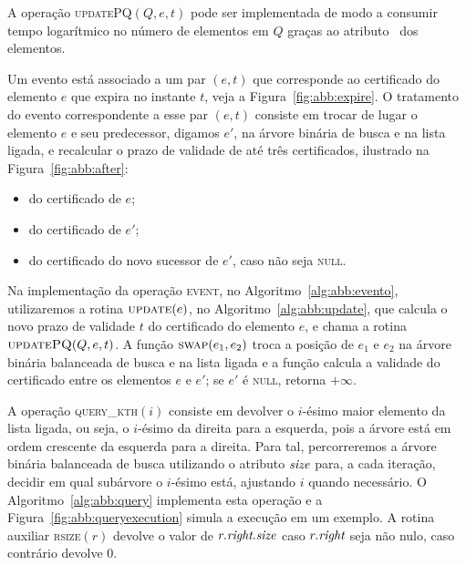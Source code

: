 A operação \textsc{updatePQ}$(Q,e,t)$ pode ser implementada de modo
a consumir tempo logarítmico no número de elementos em $Q$ graças ao
atributo \pqpos~dos elementos.



Um evento está associado a um par $(e, t)$ que corresponde ao
certificado do elemento $e$ que expira no instante $t$, veja a Figura~\ref{fig:abb:expire}.
O tratamento do evento correspondente a esse par $(e, t)$ consiste em trocar de
lugar o elemento $e$ e seu predecessor, digamos $e'$, na árvore
binária de busca e na lista ligada, e recalcular o prazo de validade
de até três certificados, ilustrado na Figura~\ref{fig:abb:after}:

\begin{itemize}
    \item do certificado de $e$;
    \item do certificado de $e'$;
    \item do certificado do novo sucessor de $e'$, caso não seja \textsc{null}.
\end{itemize}



Na implementação da operação \textsc{event}, no Algoritmo~\ref{alg:abb:evento}, utilizaremos a rotina
$\textsc{update}(e)$, no Algoritmo~\ref{alg:abb:update}, que calcula o novo prazo de validade $t$
do certificado do elemento $e$, e chama a rotina~$\textsc{updatePQ}(Q, e, t)$.
A função $\textsc{swap}(e_1, e_2)$ troca a posição de $e_1$ e $e_2$ na árvore binária balanceada
de busca e na lista ligada e a função  calcula
a validade do certificado entre os elementos $e$ e $e'$; se $e'$ é
\textsc{null}, retorna $+\infty$.





A operação \textsc{query\_kth}$(i)$ consiste em devolver o $i$-ésimo
maior elemento da lista ligada, ou seja, o $i$-ésimo da direita para
a esquerda, pois a árvore está em ordem crescente da esquerda para a
direita.
Para tal, percorreremos a árvore binária balanceada de busca utilizando o atributo $\textit{size}$
para, a cada iteração, decidir em qual subárvore o $i$-ésimo está, ajustando $i$ quando
necessário.
O Algoritmo~\ref{alg:abb:query} implementa esta operação e a Figura~\ref{fig:abb:queryexecution}
simula a execução em um exemplo.
A rotina auxiliar \textsc{rsize}$(r)$ devolve o valor de $r.\textit{right}.\textit{size}$ caso $r.\textit{right}$ seja
não nulo, caso contrário devolve $0$.

